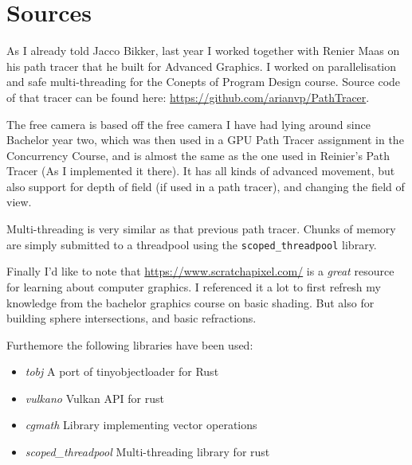 \documentclass{article}
\begin{document}
\section{Sources}
As I already told Jacco Bikker, last year I worked together with Renier Maas on his path tracer that he built
for Advanced Graphics. I worked  on parallelisation and safe multi-threading for the Conepts of Program Design course.
Source code of that tracer can be found here: \url{https://github.com/arianvp/PathTracer}.

The free camera is based off the free camera I have had lying around since
Bachelor year two, which was then used in a GPU Path Tracer assignment in the
Concurrency Course, and is almost the same as the one used in Reinier's Path
Tracer (As I implemented it there). It has all kinds of advanced movement, but
also support for depth of field (if used in a path tracer), and changing the
field of view.

Multi-threading is very similar as that previous path tracer. Chunks of memory are simply
submitted to a threadpool using the \texttt{scoped\_threadpool} library.

Finally I'd like to note that \url{https://www.scratchapixel.com/} is a
\emph{great} resource for learning about computer graphics.  I referenced it a
lot to first refresh my knowledge from the bachelor graphics course on basic
shading.  But also for building sphere intersections, and basic refractions.

Furthemore the following libraries have been used:
\begin{itemize}
  \item \emph{tobj} A port of tinyobjectloader for Rust
  \item \emph{vulkano} Vulkan API for rust
  \item \emph{cgmath} Library implementing vector operations
  \item \emph{scoped\_threadpool} Multi-threading library for rust
\end{itemize}
\end{document}
